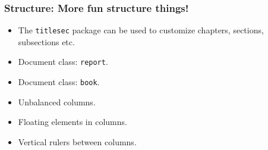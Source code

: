 \begin{frame}[fragile]
\frametitle{Structure: More fun structure things!}
\begin{itemize}[$\bullet$]
    \item The \texttt{titlesec} package can be used to customize chapters, sections, subsections etc. \pause
    \item Document class: \texttt{report}. \pause
    \item Document class:  \texttt{book}. \pause
    \item Unbalanced columns. \pause
    \item Floating elements in columns. \pause
    \item Vertical rulers between columns. 
\end{itemize}
\end{frame}






    
